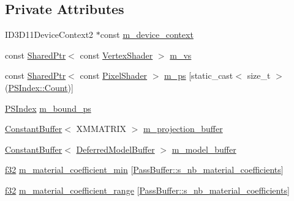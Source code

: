 \subsection*{Private Attributes}
\begin{DoxyCompactItemize}
\item 
I\+D3\+D11\+Device\+Context2 $\ast$const \hyperlink{classmage_1_1_g_buffer_pass_a009ffc6f7d459b4bda115cfb470e1fd0}{m\+\_\+device\+\_\+context}
\item 
const \hyperlink{namespacemage_a1e01ae66713838a7a67d30e44c67703e}{Shared\+Ptr}$<$ const \hyperlink{classmage_1_1_vertex_shader}{Vertex\+Shader} $>$ \hyperlink{classmage_1_1_g_buffer_pass_a5baced2ca3d5018e35d25d6c1b5d8f20}{m\+\_\+vs}
\item 
const \hyperlink{namespacemage_a1e01ae66713838a7a67d30e44c67703e}{Shared\+Ptr}$<$ const \hyperlink{namespacemage_a27ecaf266420ee7a494d64edc0757129}{Pixel\+Shader} $>$ \hyperlink{classmage_1_1_g_buffer_pass_ae607b9a6dab89d45865dc0ede3212fcd}{m\+\_\+ps} \mbox{[}static\+\_\+cast$<$ size\+\_\+t $>$(\hyperlink{classmage_1_1_g_buffer_pass_a1dbae3cb33d9c90ce7eb8c119d576379ae93f994f01c537c4e2f7d8528c3eb5e9}{P\+S\+Index\+::\+Count})\mbox{]}
\item 
\hyperlink{classmage_1_1_g_buffer_pass_a1dbae3cb33d9c90ce7eb8c119d576379}{P\+S\+Index} \hyperlink{classmage_1_1_g_buffer_pass_aef8452f64c9815d002e552957ed9e342}{m\+\_\+bound\+\_\+ps}
\item 
\hyperlink{structmage_1_1_constant_buffer}{Constant\+Buffer}$<$ X\+M\+M\+A\+T\+R\+IX $>$ \hyperlink{classmage_1_1_g_buffer_pass_a1c51afa751e58dedaad5effabc26f85d}{m\+\_\+projection\+\_\+buffer}
\item 
\hyperlink{structmage_1_1_constant_buffer}{Constant\+Buffer}$<$ \hyperlink{structmage_1_1_deferred_model_buffer}{Deferred\+Model\+Buffer} $>$ \hyperlink{classmage_1_1_g_buffer_pass_a62c6dc82f6571657d2907ab83819b6dd}{m\+\_\+model\+\_\+buffer}
\item 
\hyperlink{namespacemage_a6a44ad388483959dc4dff9f2aef91431}{f32} \hyperlink{classmage_1_1_g_buffer_pass_a2fdb9c485431181134e6a535dfa47551}{m\+\_\+material\+\_\+coefficient\+\_\+min} \mbox{[}\hyperlink{structmage_1_1_pass_buffer_a453e18abdf29c4ebb08d9e002a952bf2}{Pass\+Buffer\+::s\+\_\+nb\+\_\+material\+\_\+coefficients}\mbox{]}
\item 
\hyperlink{namespacemage_a6a44ad388483959dc4dff9f2aef91431}{f32} \hyperlink{classmage_1_1_g_buffer_pass_a6bfe0a54abbb477a3ade9c0b0073d2c2}{m\+\_\+material\+\_\+coefficient\+\_\+range} \mbox{[}\hyperlink{structmage_1_1_pass_buffer_a453e18abdf29c4ebb08d9e002a952bf2}{Pass\+Buffer\+::s\+\_\+nb\+\_\+material\+\_\+coefficients}\mbox{]}
\end{DoxyCompactItemize}


